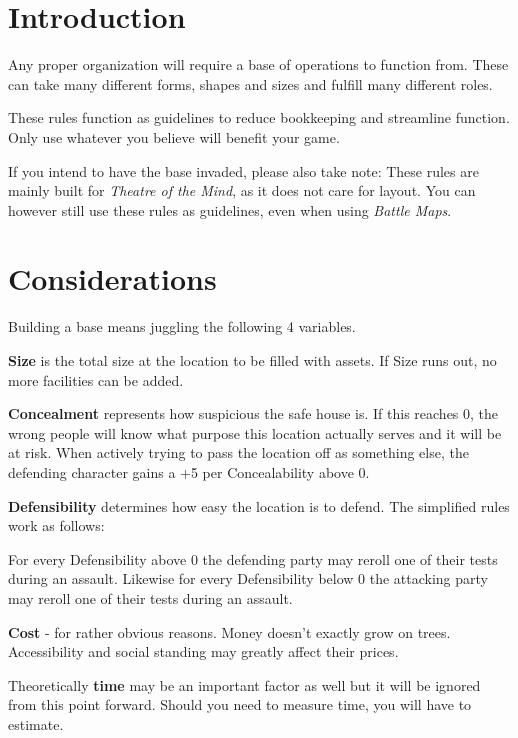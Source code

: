 \documentclass[12pt,a4paper,openany]{book}
\begin{document}
	

	\chapter{Introduction}
	Any proper organization will require a base of operations to function from. These can take many different forms, shapes and sizes and fulfill many different roles.
	\par
	These rules function as guidelines to reduce bookkeeping and streamline function. Only use whatever you believe will benefit your game.
	\par
	If you intend to have the base invaded, please also take note: These rules are mainly built for \emph{Theatre of the Mind}, as it does not care for layout. You can however still use these rules as guidelines, even when using \emph{Battle Maps}.

	\chapter{Considerations}
	Building a base means juggling the following 4 variables.\par
	\textbf{Size} is the total size at the location to be filled with assets. If Size runs out, no more facilities can be added.\par
	\textbf{Concealment} represents how suspicious the safe house is. If this reaches 0, the wrong people will know what purpose this location actually serves and it will be at risk. When actively trying to pass the location off as something else, the defending character gains a +5 per Concealability above 0.\par
	\textbf{Defensibility} determines how easy the location is to defend. The simplified rules work as follows: \par \vspace*{-10mm}
	\hspace{15mm}For every Defensibility above 0 the defending party may reroll one of their tests during an assault. Likewise for every Defensibility below 0 the attacking party may reroll one of their tests during an assault.\par
	\textbf{Cost} - for rather obvious reasons. Money doesn't exactly grow on trees. Accessibility and social standing may greatly affect their prices.\par
	Theoretically \textbf{time} may be an important factor as well but it will be ignored from this point forward. Should you need to measure time, you will have to estimate.
\end{document}
